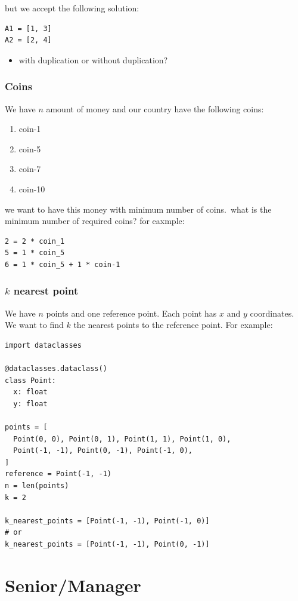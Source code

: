 \documentclass[]{book}
\begin{document}
but we accept the following solution:

\begin{verbatim}
A1 = [1, 3]
A2 = [2, 4]
\end{verbatim}

\begin{itemize}
  \item with duplication or without duplication?
\end{itemize}

\subsection{Coins}

We have $n$ amount of money and our country have the following coins:

\begin{enumerate}
  \item coin-1
  \item coin-5
  \item coin-7
  \item coin-10
\end{enumerate}

we want to have this money with minimum number of coins.\ what is the minimum number of required coins?
for eaxmple:

\begin{verbatim}
2 = 2 * coin_1
5 = 1 * coin_5
6 = 1 * coin_5 + 1 * coin-1
\end{verbatim}

\subsection{$k$ nearest point}

We have $n$ points and one reference point.
Each point has $x$ and $y$ coordinates.
We want to find $k$ the nearest points to the reference point.
For example:

\begin{verbatim}
import dataclasses

@dataclasses.dataclass()
class Point:
  x: float
  y: float

points = [
  Point(0, 0), Point(0, 1), Point(1, 1), Point(1, 0),
  Point(-1, -1), Point(0, -1), Point(-1, 0),
]
reference = Point(-1, -1)
n = len(points)
k = 2

k_nearest_points = [Point(-1, -1), Point(-1, 0)]
# or
k_nearest_points = [Point(-1, -1), Point(0, -1)]
\end{verbatim}

\chapter{Senior/Manager}
\end{document}
